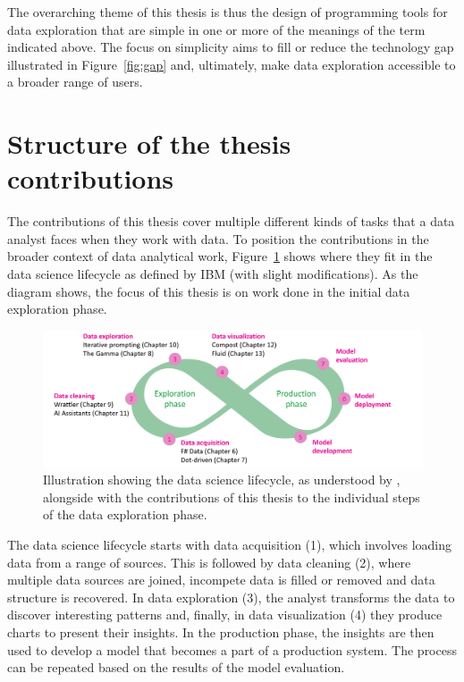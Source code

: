 \documentclass[fleqn,11pt]{report}
\theoremstyle{definition}
\begin{document}
The overarching theme of this thesis is thus the design of programming tools for data exploration
that are simple in one or more of the meanings of the term indicated above. The focus on simplicity
aims to fill or reduce the technology gap illustrated in Figure~\ref{fig:gap} and, ultimately,
make data exploration accessible to a broader range of users.

\section{Structure of the thesis contributions}

The contributions of this thesis cover multiple different kinds of tasks that a data analyst
faces when they work with data. To position the contributions in the broader context of data
analytical work, Figure~\ref{fig:lifecycle} shows where they fit in the data science lifecycle
as defined by IBM (with slight modifications). As the diagram shows, the focus of this thesis is on work done in the
initial data exploration phase.

\begin{figure}[h]
  \vspace{1em}
  \includegraphics[scale=0.2]{img/lifecycle.png}
  \vspace{-1em}
  \caption{Illustration showing the data science lifecycle, as understood by \cite{ibm-2020-lifecycle},
  alongside with the contributions of this thesis to the individual steps of the data exploration phase.}
  \label{fig:lifecycle}
\end{figure}

The data science lifecycle starts with data acquisition (1), which involves loading
data from a range of sources. This is followed by data cleaning (2), where multiple data sources
are joined, incompete data is filled or removed and data structure is recovered.
In data exploration (3), the analyst transforms the data to discover
interesting patterns and, finally, in data visualization (4) they produce charts to present
their insights. In the production phase, the insights are then used to develop a model
that becomes a part of a production system. The process can be repeated based on the results
of the model evaluation.
\end{document}
